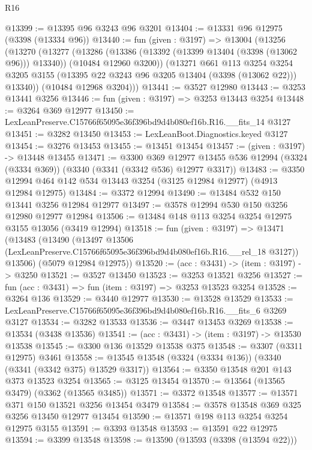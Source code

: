 \begin{lexlean}{R16}
\begin{coremodule}
@13399 := @13395 @96 @3243 @96 @3201
@13404 := @13331 @96 @12975 (@3398 (@13334 @96))
@13440 := fun (given : @3197) =>
  @13004
    (@13256
      (@13270
        (@13277
          (@13286
            (@13386 (@13392 (@13399 @13404 (@3398 (@13062 @96))) @13340))
            (@10484 @12960 @3200))
          (@13271
            @661
            @113
            @3254
            @3254
            @3205
            @3155
            (@13395 @22 @3243 @96 @3205 @13404 (@3398 (@13062 @22)))
            @13340))
        (@10484 @12968 @3204)))
@13441 := @3527 @12980
@13443 := @3253 @13441 @3256
@13446 := fun (given : @3197) => @3253 @13443 @3254
@13448 := @3264 @369 @12977
@13450 := LexLeanPreserve.C15766f65095e36f396bd9d4b080ef16b.R16.__fits_14 @3127
@13451 := @3282 @13450
@13453 := LexLeanBoot.Diagnostics.keyed @3127
@13454 := @3276 @13453
@13455 := @13451 @13454
@13457 := (given : @3197) -> @13448 @13455
@13471 := @3300
    @369
    @12977
    @13455
    @536
    @12994
    (@3324 (@3334 @369))
    (@3340 (@3341 (@3342 @536) @12977 @3317))
@13483 := @3350 @12994 @464 @142 @534 @13443 @3254 (@3125 @12984 @12977) (@4913 @12984 @12975)
@13484 := @3372 @12994
@13490 := @13484 @532 @150 @13441 @3256 @12984 @12977
@13497 := @3578 @12994 @530 @150 @3256 @12980 @12977 @12984
@13506 := @13484 @148 @113 @3254 @3254 @12975 @3155 @13056 (@3419 @12994)
@13518 := fun (given : @3197) =>
  @13471
    (@13483
      (@13490
        (@13497 @13506 (LexLeanPreserve.C15766f65095e36f396bd9d4b080ef16b.R16.__rel_18 @3127))
        @13506)
      (@5079 @12984 @12975))
@13520 := (acc : @3431) -> (item : @3197) -> @3250
@13521 := @3527 @13450
@13523 := @3253 @13521 @3256
@13527 := fun (acc : @3431) => fun (item : @3197) => @3253 @13523 @3254
@13528 := @3264 @136
@13529 := @3440 @12977
@13530 := @13528 @13529
@13533 := LexLeanPreserve.C15766f65095e36f396bd9d4b080ef16b.R16.__fits_6 @3269 @3127
@13534 := @3282 @13533
@13536 := @3447 @13453 @3269
@13538 := @13534 (@3438 @13536)
@13541 := (acc : @3431) -> (item : @3197) -> @13530 @13538
@13545 := @3300 @136 @13529 @13538 @375
@13548 := @3307 (@3311 @12975) @3461
@13558 := @13545 @13548 (@3324 (@3334 @136)) (@3340 (@3341 (@3342 @375) @13529 @3317))
@13564 := @3350 @13548 @201 @143 @373 @13523 @3254
@13565 := @3125 @13454
@13570 := @13564 (@13565 @3479) (@3362 (@13565 @3485))
@13571 := @3372 @13548
@13577 := @13571 @371 @150 @13521 @3256 @13454 @3479
@13584 := @3578 @13548 @369 @325 @3256 @13450 @12977 @13454
@13590 := @13571 @198 @113 @3254 @3254 @12975 @3155
@13591 := @3393 @13548
@13593 := @13591 @22 @12975
@13594 := @3399 @13548
@13598 := @13590 (@13593 (@3398 (@13594 @22)))

\end{coremodule}
\end{lexlean}
